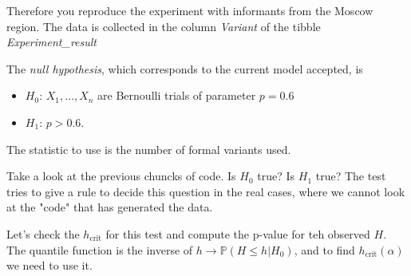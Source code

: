 Therefore you reproduce the experiment with informants from the Moscow region. The data is collected in the column \textit{Variant} of the tibble \textit{ Experiment\_result}
\begin{knitrout}
\color{fgcolor}\begin{kframe}
\begin{alltt}
\hlopt{$}
\end{alltt}


{\ttfamily\noindent\bfseries\color{errorcolor}{\#\# Error in head(Experiment\_result\$Variant): oggetto 'Experiment\_result' non trovato}}\end{kframe}
\end{knitrout}
	The \emph{ null hypothesis}, which corresponds to the current model accepted, is 
	\begin{itemize}
		\item 	$H_0$: $X_1, \ldots, X_n $ are  Bernoulli trials of parameter $p = 0.6$
		\item $H_1$: $p>0.6$.
	\end{itemize}
	The statistic to use is the number of formal variants used. 
	\begin{ExerciseList}
		\Exercise Take a look at the previous chuncks of code. Is $H_0$ true? Is $H_1$ true?  The test tries to give a rule to decide this question in the real cases, where we cannot look at the "code" that has generated the data. 
	\end{ExerciseList}
		Let's check the $h_{\text{crit}}$  for this test and compute the p-value for teh observed $H$. The quantile function is the inverse of $h \to \mathbb P( H \leq h | H_0)$, and to find $h_{\text{crit}}(\alpha)$ we need to use it. 
